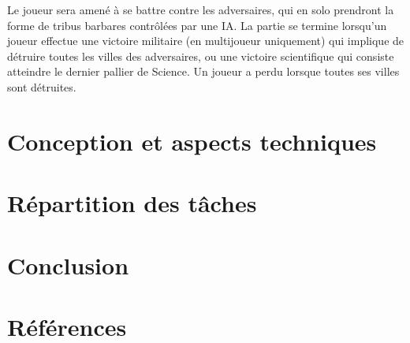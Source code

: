 \documentclass[12pt]{report}
\begin{document}
Le joueur sera amené à se battre contre les adversaires, qui en solo prendront la forme de tribus barbares contrôlées par une IA. La partie se termine lorsqu'un joueur effectue une victoire militaire (en multijoueur uniquement) qui implique de détruire toutes les villes des adversaires, ou une victoire scientifique qui consiste atteindre le dernier pallier de Science. Un joueur a perdu lorsque toutes ses villes sont détruites.

\chapter{Conception et aspects techniques}

\chapter{Répartition des tâches}

\chapter{Conclusion}

\chapter{Références}
\end{document}
